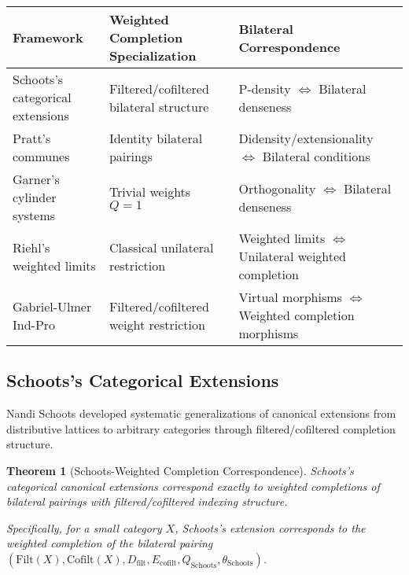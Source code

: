\documentclass[11pt]{article}
\theoremstyle{plain}
\newtheorem{theorem}{Theorem}[section]
\theoremstyle{definition}
\theoremstyle{remark}
\begin{document}
\begin{center}
\renewcommand{\arraystretch}{1.4}
\begin{longtable}{@{}p{3.5cm}p{3.5cm}p{7cm}@{}}
\toprule
\textbf{Framework} & \textbf{Weighted Completion Specialization} & \textbf{Bilateral Correspondence} \\
\midrule
Schoots's categorical extensions & Filtered/cofiltered bilateral structure & P-density $\Leftrightarrow$ Bilateral denseness \\
\addlinespace
Pratt's communes & Identity bilateral pairings & Didensity/extensionality $\Leftrightarrow$ Bilateral conditions \\
\addlinespace
Garner's cylinder systems & Trivial weights $Q = 1$ & Orthogonality $\Leftrightarrow$ Bilateral denseness \\
\addlinespace
Riehl's weighted limits & Classical unilateral restriction & Weighted limits $\Leftrightarrow$ Unilateral weighted completion \\
\addlinespace
Gabriel-Ulmer Ind-Pro & Filtered/cofiltered weight restriction & Virtual morphisms $\Leftrightarrow$ Weighted completion morphisms \\
\bottomrule
\end{longtable}
\end{center}

\subsection{Schoots's Categorical Extensions}

Nandi Schoots \cite{schoots2015generalising} developed systematic generalizations of canonical extensions from distributive lattices to arbitrary categories through filtered/cofiltered completion structure.

\begin{theorem}[Schoots-Weighted Completion Correspondence]\label{thm:schoots-correspondence}
Schoots's categorical canonical extensions correspond exactly to weighted completions of bilateral pairings with filtered/cofiltered indexing structure.

Specifically, for a small category $X$, Schoots's extension corresponds to the weighted completion of the bilateral pairing $(\text{Filt}(X), \text{Cofilt}(X), D_{\text{filt}}, E_{\text{cofilt}}, Q_{\text{Schoots}}, \theta_{\text{Schoots}})$.
\end{theorem}
\end{document}
